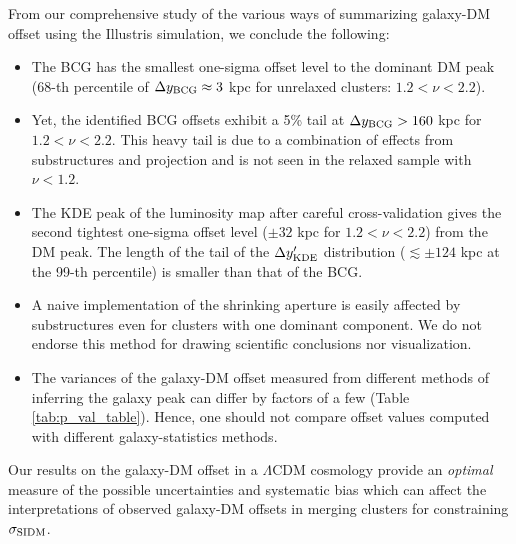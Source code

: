 \documentclass[usenatbib]{mn2e}
\newcommand{\SIDM}{{\rm SIDM}}
\begin{document}
{From our comprehensive study of the various ways of summarizing 
galaxy-DM offset using the Illustris simulation, we conclude the following:

\begin{itemize}

		\item The BCG has the smallest one-sigma offset level to the dominant DM
			peak (68-th percentile of $\Delta y_{\rm BCG} \approx 3$ kpc for unrelaxed clusters: $1.2 <
			\nu < 2.2$).\\

		\item Yet, the identified BCG offsets exhibit a 5\% tail at $\Delta y_{\rm BCG} >
			160$ kpc for $1.2 < \nu < 2.2$. 
		 This heavy tail is due to a combination of effects from substructures and 
		 projection and is not seen in the relaxed sample with $\nu < 1.2$. \\

		\item The KDE peak of the luminosity map after careful cross-validation 
			gives the second tightest one-sigma offset level ($\pm 32$ kpc for $1.2 <
			\nu < 2.2$) from the DM peak.  
			The length of the tail of the $\Delta y_{\rm KDE}'$ distribution
			($\lesssim \pm 124$ kpc at the 99-th percentile)
			is smaller than that of the BCG.\\

		\item A naive implementation of the shrinking aperture is easily affected 
			by substructures even for clusters with one
			dominant component. We do not endorse this method for drawing scientific
			conclusions nor visualization.\\

		\item The variances of the galaxy-DM offset measured from different methods
			of inferring the galaxy peak can differ by factors of a few (Table \ref{tab:p_val_table}). 
			Hence, one should not compare offset values computed with different galaxy-statistics methods.
			
\end{itemize}

Our results on the galaxy-DM offset in a $\Lambda$CDM cosmology provide an {\it optimal} measure of the possible uncertainties and systematic bias which can affect the interpretations of observed galaxy-DM offsets in merging clusters for constraining $\sigma_\SIDM$.

}
\end{document}
